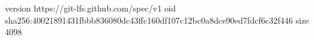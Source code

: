 version https://git-lfs.github.com/spec/v1
oid sha256:40021891431fbbb836080dc43ffc160df107c12bc0a8dce90ed7fdcf6c32f446
size 4098
